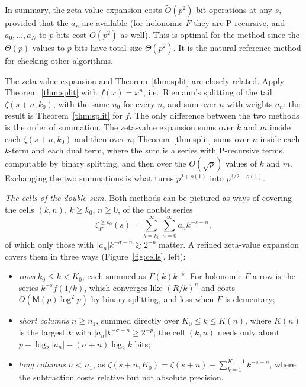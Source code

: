 \documentclass[11pt,reqno]{amsart}
\theoremstyle{definition}
\theoremstyle{remark}
\newcommand{\Mul}{\mathsf{M}}
\begin{document}
In summary, the zeta-value expansion costs $\widetilde O(p^2)$ bit operations at any $s$, provided that the $a_n$ are available
(for holonomic $F$ they are P-recursive, and $a_0, \dots, a_N$ to $p$ bits cost $\widetilde O(p^2)$ as well). This is optimal for the method since
the $\Theta(p)$ values to $p$ bits have total size $\Theta(p^2)$. It is the natural reference method for checking
other algorithms.

The zeta-value expansion and Theorem~\ref{thm:split} are closely related. Apply Theorem~\ref{thm:split} with
$f(x) = x^n$, i.e.\ Riemann's splitting of the tail $\zeta(s+n,k_0)$, with the same $u_0$ for every $n$, and sum over
$n$ with weights $a_n$: the result is Theorem~\ref{thm:split} for $f$. The only difference between the two methods is
the order of summation. The zeta-value expansion sums over $k$ and $m$ inside each $\zeta(s+n,k_0)$ and then over
$n$; Theorem~\ref{thm:split} sums over $n$ inside each $k$-term and each dual term, where the sum is a series with
P-recursive terms, computable by binary splitting, and then over the $O(\sqrt p)$ values of $k$ and $m$. Exchanging the
two summations is what turns $p^{2+o(1)}$ into $p^{3/2+o(1)}$.

\emph{The cells of the double sum.} Both methods can be pictured as ways of covering the cells $(k, n)$,
$k \ge k_0$, $n \ge 0$, of the double series
\[
  \zeta_F^{\ge k_0}(s) = \sum_{k=k_0}^{\infty}\sum_{n=0}^{\infty}a_nk^{-s-n},
\]
of which only those with $|a_n|k^{-\sigma-n} \gtrsim 2^{-p}$ matter. A refined zeta-value expansion covers
them in three ways (Figure~\ref{fig:cells}, left):
\begin{itemize}
\item \emph{rows} $k_0 \le k < K_0$, each summed as $F(k)k^{-s}$. For holonomic $F$ a row is the series
$k^{-s}f(1/k)$, which converges like $(R/k)^n$ and costs $O(\Mul(p)\log^2p)$ by binary splitting, and less when $F$ is
elementary;
\item \emph{short columns} $n \ge n_1$, summed directly over $K_0 \le k \le K(n)$, where $K(n)$ is the largest $k$
with $|a_n|k^{-\sigma-n} \ge 2^{-p}$; the cell $(k, n)$ needs only about $p + \log_2|a_n| - (\sigma+n)\log_2k$ bits;
\item \emph{long columns} $n < n_1$, as $\zeta(s+n, K_0) = \zeta(s+n) - \sum_{k=1}^{K_0-1}k^{-s-n}$, where the
subtraction costs relative but not absolute precision.
\end{itemize}
\end{document}
